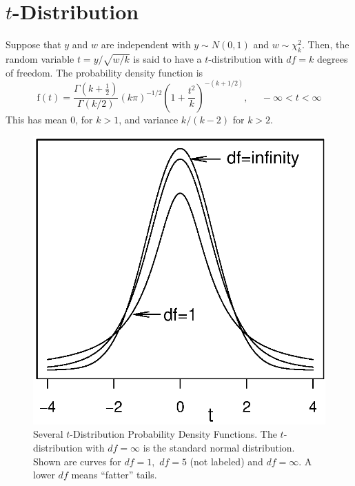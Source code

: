 \newpage
\section{$t$-Distribution}
Suppose that $y$ and $w$ are independent with $y \sim N(0,1)$ and $w
\sim \chi_k^2$. Then, the random variable $t = y / \sqrt{w/k}$ is
said to have a $t$-distribution with $df=k$ degrees of freedom. The
probability density function is
\begin{equation*}
\mathrm{f}(t)= \frac{\Gamma \left( k+ \frac{1}{2}
\right)}{\Gamma(k/2)} \left( k \pi \right)^{-1/2} \left( 1 +
\frac{t^2}{k} \right)^{-(k+1/2)}, ~~~~~~-\infty <t<\infty
\end{equation*}
This has mean 0, for $k>1$, and variance $k/(k-2)$ for $k>2$.

\begin{figure}[htp]
  \begin{center}
    \includegraphics[scale=.6]{Appendices/FAppendt.eps}
    \caption{ \small  Several $t$-Distribution Probability Density Functions.
    The $t$-distribution with $df = \infty$ is the standard normal distribution. Shown are curves for $df=1,$
    $df=5$ (not labeled) and $df = \infty$. A lower $df$ means ``fatter'' tails.}
  \end{center}
\end{figure}


